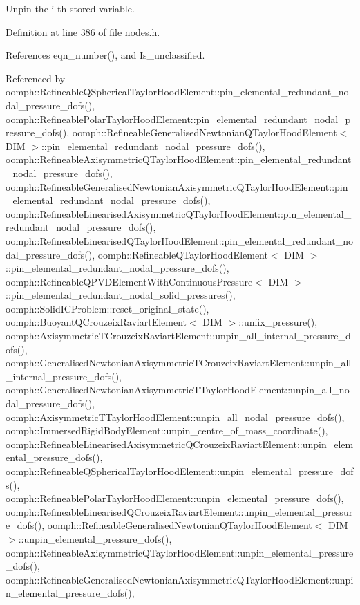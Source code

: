 Unpin the i-\/th stored variable. 



Definition at line 386 of file nodes.\+h.



References eqn\+\_\+number(), and Is\+\_\+unclassified.



Referenced by oomph\+::\+Refineable\+Q\+Spherical\+Taylor\+Hood\+Element\+::pin\+\_\+elemental\+\_\+redundant\+\_\+nodal\+\_\+pressure\+\_\+dofs(), oomph\+::\+Refineable\+Polar\+Taylor\+Hood\+Element\+::pin\+\_\+elemental\+\_\+redundant\+\_\+nodal\+\_\+pressure\+\_\+dofs(), oomph\+::\+Refineable\+Generalised\+Newtonian\+Q\+Taylor\+Hood\+Element$<$ D\+I\+M $>$\+::pin\+\_\+elemental\+\_\+redundant\+\_\+nodal\+\_\+pressure\+\_\+dofs(), oomph\+::\+Refineable\+Axisymmetric\+Q\+Taylor\+Hood\+Element\+::pin\+\_\+elemental\+\_\+redundant\+\_\+nodal\+\_\+pressure\+\_\+dofs(), oomph\+::\+Refineable\+Generalised\+Newtonian\+Axisymmetric\+Q\+Taylor\+Hood\+Element\+::pin\+\_\+elemental\+\_\+redundant\+\_\+nodal\+\_\+pressure\+\_\+dofs(), oomph\+::\+Refineable\+Linearised\+Axisymmetric\+Q\+Taylor\+Hood\+Element\+::pin\+\_\+elemental\+\_\+redundant\+\_\+nodal\+\_\+pressure\+\_\+dofs(), oomph\+::\+Refineable\+Linearised\+Q\+Taylor\+Hood\+Element\+::pin\+\_\+elemental\+\_\+redundant\+\_\+nodal\+\_\+pressure\+\_\+dofs(), oomph\+::\+Refineable\+Q\+Taylor\+Hood\+Element$<$ D\+I\+M $>$\+::pin\+\_\+elemental\+\_\+redundant\+\_\+nodal\+\_\+pressure\+\_\+dofs(), oomph\+::\+Refineable\+Q\+P\+V\+D\+Element\+With\+Continuous\+Pressure$<$ D\+I\+M $>$\+::pin\+\_\+elemental\+\_\+redundant\+\_\+nodal\+\_\+solid\+\_\+pressures(), oomph\+::\+Solid\+I\+C\+Problem\+::reset\+\_\+original\+\_\+state(), oomph\+::\+Buoyant\+Q\+Crouzeix\+Raviart\+Element$<$ D\+I\+M $>$\+::unfix\+\_\+pressure(), oomph\+::\+Axisymmetric\+T\+Crouzeix\+Raviart\+Element\+::unpin\+\_\+all\+\_\+internal\+\_\+pressure\+\_\+dofs(), oomph\+::\+Generalised\+Newtonian\+Axisymmetric\+T\+Crouzeix\+Raviart\+Element\+::unpin\+\_\+all\+\_\+internal\+\_\+pressure\+\_\+dofs(), oomph\+::\+Generalised\+Newtonian\+Axisymmetric\+T\+Taylor\+Hood\+Element\+::unpin\+\_\+all\+\_\+nodal\+\_\+pressure\+\_\+dofs(), oomph\+::\+Axisymmetric\+T\+Taylor\+Hood\+Element\+::unpin\+\_\+all\+\_\+nodal\+\_\+pressure\+\_\+dofs(), oomph\+::\+Immersed\+Rigid\+Body\+Element\+::unpin\+\_\+centre\+\_\+of\+\_\+mass\+\_\+coordinate(), oomph\+::\+Refineable\+Linearised\+Axisymmetric\+Q\+Crouzeix\+Raviart\+Element\+::unpin\+\_\+elemental\+\_\+pressure\+\_\+dofs(), oomph\+::\+Refineable\+Q\+Spherical\+Taylor\+Hood\+Element\+::unpin\+\_\+elemental\+\_\+pressure\+\_\+dofs(), oomph\+::\+Refineable\+Polar\+Taylor\+Hood\+Element\+::unpin\+\_\+elemental\+\_\+pressure\+\_\+dofs(), oomph\+::\+Refineable\+Linearised\+Q\+Crouzeix\+Raviart\+Element\+::unpin\+\_\+elemental\+\_\+pressure\+\_\+dofs(), oomph\+::\+Refineable\+Generalised\+Newtonian\+Q\+Taylor\+Hood\+Element$<$ D\+I\+M $>$\+::unpin\+\_\+elemental\+\_\+pressure\+\_\+dofs(), oomph\+::\+Refineable\+Axisymmetric\+Q\+Taylor\+Hood\+Element\+::unpin\+\_\+elemental\+\_\+pressure\+\_\+dofs(), oomph\+::\+Refineable\+Generalised\+Newtonian\+Axisymmetric\+Q\+Taylor\+Hood\+Element\+::unpin\+\_\+elemental\+\_\+pressure\+\_\+dofs(), 